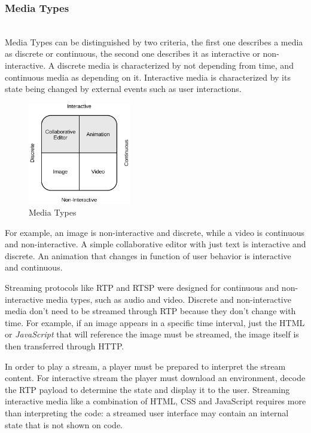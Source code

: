 \subsubsection{Media Types}\label{mediatype}~\\
	Media Types can be distinguished by two criteria, the first one describes a media as discrete or continuous, the second one describes it as interactive or non-interactive. A discrete media is characterized by not depending from time, and continuous media as depending on it. Interactive media is characterized by its state being changed by external events such as user interactions.
\begin{figure}[H]
	\centering
	\includegraphics[width=0.4\textwidth]{figures/media_types.png}
	\caption{Media Types}
\end{figure}
	For example, an image is non-interactive and discrete, while a video is continuous and non-interactive. A simple collaborative editor with just text is interactive and discrete. An animation that changes in function of user behavior is interactive and continuous.

	Streaming protocols like \ac {RTP} and \ac{RTSP} were designed for continuous and non-interactive media types, such as audio and video. Discrete and non-interactive media don't need to be streamed through \ac{RTP} because they don't change with time. For example, if an image appears in a specific time interval, just the \ac{HTML} or \emph{JavaScript} that will reference the image must be streamed, the image itself is then transferred through \ac{HTTP}.

	In order to play a stream, a player must be prepared to interpret the stream content. For interactive stream the player must download an environment, decode the \ac{RTP} payload to determine the state and display it to the user. Streaming interactive media like a combination of \ac{HTML}, \ac{CSS} and JavaScript requires more than interpreting the code: a streamed user interface may contain an internal state that is not shown on code.
        

